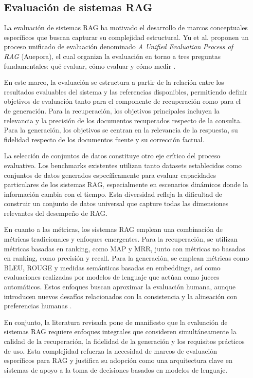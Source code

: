 \documentclass[
	spanish, %
	letterpaper, oneside
]{book}
\begin{document}
\subsection{Evaluación de sistemas RAG}

La evaluación de sistemas RAG ha motivado el desarrollo de marcos conceptuales específicos que buscan capturar su complejidad estructural. Yu et al. proponen un proceso unificado de evaluación denominado \emph{A Unified Evaluation Process of RAG} (Auepora), el cual organiza la evaluación en torno a tres preguntas fundamentales: qué evaluar, cómo evaluar y cómo medir \cite{yu2024rag_survey}.

En este marco, la evaluación se estructura a partir de la relación entre los resultados evaluables del sistema y las referencias disponibles, permitiendo definir objetivos de evaluación tanto para el componente de recuperación como para el de generación. Para la recuperación, los objetivos principales incluyen la relevancia y la precisión de los documentos recuperados respecto de la consulta. Para la generación, los objetivos se centran en la relevancia de la respuesta, su fidelidad respecto de los documentos fuente y su corrección factual.

La selección de conjuntos de datos constituye otro eje crítico del proceso evaluativo. Los benchmarks existentes utilizan tanto datasets establecidos como conjuntos de datos generados específicamente para evaluar capacidades particulares de los sistemas RAG, especialmente en escenarios dinámicos donde la información cambia con el tiempo. Esta diversidad refleja la dificultad de construir un conjunto de datos universal que capture todas las dimensiones relevantes del desempeño de RAG.

En cuanto a las métricas, los sistemas RAG emplean una combinación de métricas tradicionales y enfoques emergentes. Para la recuperación, se utilizan métricas basadas en ranking, como MAP y MRR, junto con métricas no basadas en ranking, como precisión y recall. Para la generación, se emplean métricas como BLEU, ROUGE y medidas semánticas basadas en embeddings, así como evaluaciones realizadas por modelos de lenguaje que actúan como jueces automáticos. Estos enfoques buscan aproximar la evaluación humana, aunque introducen nuevos desafíos relacionados con la consistencia y la alineación con preferencias humanas \cite{yu2024rag_survey}.

En conjunto, la literatura revisada pone de manifiesto que la evaluación de sistemas RAG requiere enfoques integrales que consideren simultáneamente la calidad de la recuperación, la fidelidad de la generación y los requisitos prácticos de uso. Esta complejidad refuerza la necesidad de marcos de evaluación específicos para RAG y justifica su adopción como una arquitectura clave en sistemas de apoyo a la toma de decisiones basados en modelos de lenguaje.
\end{document}
